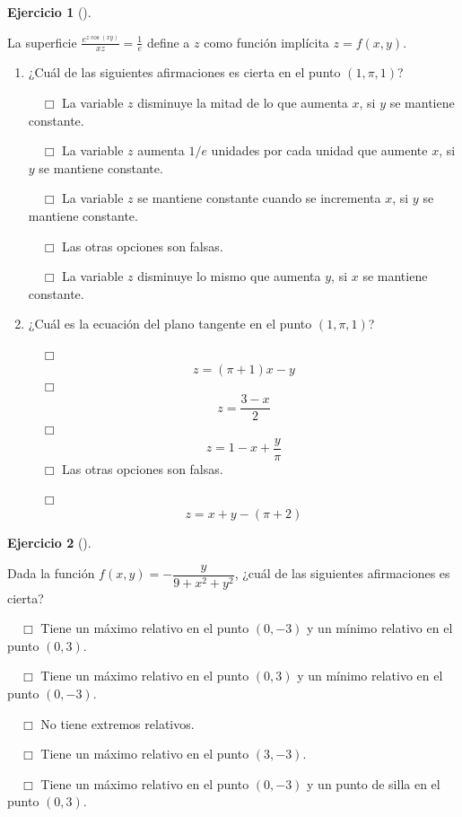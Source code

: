 \documentclass[
  a4paper,
]{scrreport}
\theoremstyle{definition}
\newtheorem{exercise}{Ejercicio}[chapter]
\theoremstyle{remark}
\begin{document}
\begin{exercise}[]\protect\hypertarget{exr-derivadas-funciones-varias-variables-propuesto-4}{}\label{exr-derivadas-funciones-varias-variables-propuesto-4}

La superficie \(\frac{e^{z\cos(xy)}}{xz}=\frac{1}{e}\) define a \(z\)
como función implícita \(z=f(x,y)\).

\begin{enumerate}
\def\labelenumi{\alph{enumi}.}
\item
  ¿Cuál de las siguientes afirmaciones es cierta en el punto
  \((1,\pi,1)\)?

  ${\quad\Box}$ La variable $z$ disminuye la mitad de lo que aumenta $x$, si $y$ se mantiene constante.

  ${\quad\Box}$ La variable $z$ aumenta $1/e$ unidades por cada unidad que aumente $x$, si $y$ se mantiene constante.

  ${\quad\Box}$ La variable $z$ se mantiene constante cuando se incrementa $x$, si $y$ se mantiene constante.

  ${\quad\Box}$ Las otras opciones son falsas.

  ${\quad\Box}$ La variable $z$ disminuye lo mismo que aumenta $y$, si $x$ se mantiene constante.
\item
  ¿Cuál es la ecuación del plano tangente en el punto \((1,\pi,1)\)?

  ${\quad\Box}$ $$z=(\pi+1)x-y$$
  ${\quad\Box}$ $$z=\frac{3-x}{2}$$
  ${\quad\Box}$ $$z=1-x+\frac{y}{\pi}$$
  ${\quad\Box}$ Las otras opciones son falsas.

  ${\quad\Box}$ $$z=x+y-(\pi+2)$$
\end{enumerate}

\end{exercise}

\begin{exercise}[]\protect\hypertarget{exr-derivadas-funciones-varias-variables-propuesto-5}{}\label{exr-derivadas-funciones-varias-variables-propuesto-5}

Dada la función \(f(x,y)=-\dfrac{y}{9+x^2+y^2}\), ¿cuál de las
siguientes afirmaciones es cierta?

${\quad\Box}$ Tiene un máximo relativo en el punto $(0,-3)$ y un mínimo relativo en el punto $(0,3)$.

${\quad\Box}$ Tiene un máximo relativo en el punto $(0,3)$ y un mínimo relativo en el punto $(0,-3)$.

${\quad\Box}$ No tiene extremos relativos.

${\quad\Box}$ Tiene un máximo relativo en el punto $(3,-3)$.

${\quad\Box}$ Tiene un máximo relativo en el punto $(0,-3)$ y un punto de silla en el punto $(0,3)$.

\end{exercise}
\end{document}
